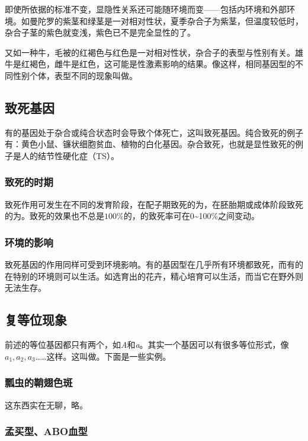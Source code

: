 即使所依据的标准不变，显隐性关系还可能随环境而变——包括内环境和外部环境。如曼陀罗的紫茎和绿茎是一对相对性状，夏季杂合子为紫茎，但温度较低时，杂合子茎的紫色就变浅，紫色已不是完全显性的了。

又如一种牛，毛被的红褐色与红色是一对相对性状，杂合子的表型与性别有关。雄牛是红褐色，雌牛是红色，这可能是性激素影响的结果。像这样，相同基因型的不同性别个体，表型不同的现象叫做。

\subsection{致死基因}

有的基因处于杂合或纯合状态时会导致个体死亡，这叫致死基因。纯合致死的例子有：黄色小鼠、镰状细胞贫血、植物的白化基因。杂合致死，也就是显性致死的例子是人的结节性硬化症（TS）。

\subsubsection{致死的时期}

致死作用可发生在不同的发育阶段，在配子期致死的为，在胚胎期或成体阶段致死的为。致死的效果也不总是$100\%$的，的致死率可在0\textasciitilde100\%之间变动。

\subsubsection{环境的影响}

致死基因的作用同样可受到环境影响。有的基因型在几乎所有环境都致死，而有的在特别的环境则可以生活。如选育出的花卉，精心培育可以生活，而当它在野外则无法生存。

\subsection{复等位现象}

前述的等位基因都只有两个，如\textit{A}和\textit{a}。其实一个基因可以有很多等位形式，像$a_{1},a_{2},a_{3}$……这样。这叫做。下面是一些实例。

\subsubsection{瓢虫的鞘翅色斑}

这东西实在无聊，略。

\subsubsection{孟买型、ABO血型}

